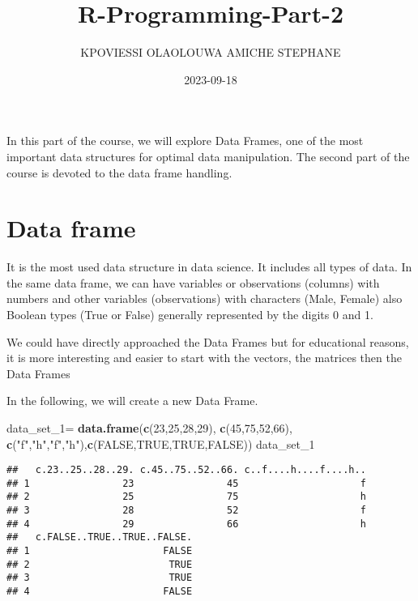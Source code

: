 \documentclass[
]{article}
\title{R-Programming-Part-2}
\author{KPOVIESSI OLAOLOUWA AMICHE STEPHANE}
\date{2023-09-18}
\newenvironment{Shaded}{\begin{snugshade}}{\end{snugshade}}
\newcommand{\ConstantTok}[1]{\textcolor[rgb]{0.56,0.35,0.01}{#1}}
\newcommand{\DecValTok}[1]{\textcolor[rgb]{0.00,0.00,0.81}{#1}}
\newcommand{\FunctionTok}[1]{\textcolor[rgb]{0.13,0.29,0.53}{\textbf{#1}}}
\newcommand{\NormalTok}[1]{#1}
\newcommand{\OtherTok}[1]{\textcolor[rgb]{0.56,0.35,0.01}{#1}}
\newcommand{\StringTok}[1]{\textcolor[rgb]{0.31,0.60,0.02}{#1}}
\begin{document}
\maketitle

In this part of the course, we will explore Data Frames, one of the most
important data structures for optimal data manipulation. The second part
of the course is devoted to the data frame handling.

\hypertarget{data-frame}{%
\section{Data frame}\label{data-frame}}

It is the most used data structure in data science. It includes all
types of data. In the same data frame, we can have variables or
observations (columns) with numbers and other variables (observations)
with characters (Male, Female) also Boolean types (True or False)
generally represented by the digits 0 and 1.

We could have directly approached the Data Frames but for educational
reasons, it is more interesting and easier to start with the vectors,
the matrices then the Data Frames

In the following, we will create a new Data Frame.

\begin{Shaded}
\begin{Highlighting}[]
\NormalTok{data\_set\_1}\OtherTok{=} \FunctionTok{data.frame}\NormalTok{(}\FunctionTok{c}\NormalTok{(}\DecValTok{23}\NormalTok{,}\DecValTok{25}\NormalTok{,}\DecValTok{28}\NormalTok{,}\DecValTok{29}\NormalTok{), }\FunctionTok{c}\NormalTok{(}\DecValTok{45}\NormalTok{,}\DecValTok{75}\NormalTok{,}\DecValTok{52}\NormalTok{,}\DecValTok{66}\NormalTok{), }\FunctionTok{c}\NormalTok{(}\StringTok{"f"}\NormalTok{,}\StringTok{"h"}\NormalTok{,}\StringTok{"f"}\NormalTok{,}\StringTok{"h"}\NormalTok{),}\FunctionTok{c}\NormalTok{(}\ConstantTok{FALSE}\NormalTok{,}\ConstantTok{TRUE}\NormalTok{,}\ConstantTok{TRUE}\NormalTok{,}\ConstantTok{FALSE}\NormalTok{))}
\NormalTok{data\_set\_1}
\end{Highlighting}
\end{Shaded}

\begin{verbatim}
##   c.23..25..28..29. c.45..75..52..66. c..f....h....f....h..
## 1                23                45                     f
## 2                25                75                     h
## 3                28                52                     f
## 4                29                66                     h
##   c.FALSE..TRUE..TRUE..FALSE.
## 1                       FALSE
## 2                        TRUE
## 3                        TRUE
## 4                       FALSE
\end{verbatim}
\end{document}
